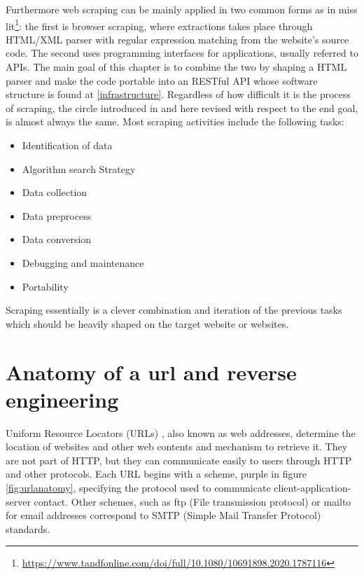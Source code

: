\documentclass[
  12pt,
  a4paper,
  oneside]{book}
\DeclareRobustCommand{\href}[2]{#2\footnote{\url{#1}}}
\providecommand{\tightlist}{%
  \setlength{\itemsep}{0pt}\setlength{\parskip}{0pt}}
\theoremstyle{definition}
\theoremstyle{definition}
\theoremstyle{definition}
\theoremstyle{remark}
\begin{document}
Furthermore web scraping can be mainly applied in two common forms as in \href{https://www.tandfonline.com/doi/full/10.1080/10691898.2020.1787116}{miss lit}: the first is browser scraping, where extractions takes place through HTML/XML parser with regular expression matching from the website's source code. The second uses programming interfaces for applications, usually referred to APIs. The main goal of this chapter is to combine the two by shaping a HTML parser and make the code portable into an RESTful API whose software structure is found at \ref{infrastructure}.
Regardless of how difficult it is the process of scraping, the circle introduced in \citet{automateddata} and here revised with respect to the end goal, is almost always the same. Most scraping activities include the following tasks:

\begin{itemize}
\tightlist
\item
  Identification of data
\item
  Algorithm search Strategy
\item
  Data collection
\item
  Data preprocess
\item
  Data conversion
\item
  Debugging and maintenance
\item
  Portability
\end{itemize}

Scraping essentially is a clever combination and iteration of the previous tasks which should be heavily shaped on the target website or websites.

\hypertarget{anatomy-of-a-url-and-reverse-engineering}{%
\section{Anatomy of a url and reverse engineering}\label{anatomy-of-a-url-and-reverse-engineering}}

Uniform Resource Locators (URLs) \citep{wiki:url}, also known as web addresses, determine the location of websites and other web contents and mechanism to retrieve it. They are not part of HTTP, but they can communicate easily to users through HTTP and other protocols.
Each URL begins with a scheme, purple in figure \ref{fig:urlanatomy}, specifying the protocol used to communicate client-application-server contact. Other schemes, such as ftp (File transmission protocol) or mailto for email addresses correspond to SMTP (Simple Mail Transfer Protocol) standards.
\end{document}
